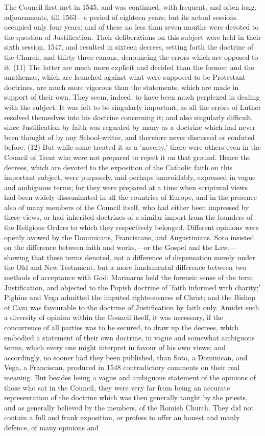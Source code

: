 \documentclass[
]{book}
\begin{document}
The Council first met in 1545, and was continued, with frequent, and often long, adjournments, till 1563---a period of eighteen years; but its actual sessions occupied only four years; and of these no less than seven months were devoted to the question of Justification. Their deliberations on this subject were held in their sixth session, 1547, and resulted in sixteen decrees, setting forth the doctrine of the Church, and thirty-three canons, denouncing the errors which are opposed to it. (11) The latter are much more explicit and decided than the former; and the anathemas, which are launched against what were supposed to be Protestant doctrines, are much more vigorous than the statements, which are made in support of their own. They seem, indeed, to have been much perplexed in dealing with the subject. It was felt to be singularly important, as all the errors of Luther resolved themselves into his doctrine concerning it; and also singularly difficult, since Justification by faith was regarded by many as a doctrine which had never been thought of by any School-writer, and therefore never discussed or confuted before. (12) But while some treated it as a 'novelty,' there were others even in the Council of Trent who were not prepared to reject it on that ground. Hence the decrees, which are devoted to the exposition of the Catholic faith on this important subject, were purposely, and perhaps unavoidably, expressed in vague and ambiguous terms; for they were prepared at a time when scriptural views had been widely disseminated in all the countries of Europe, and in the presence also of many members of the Council itself, who had either been impressed by these views, or had inherited doctrines of a similar import from the founders of the Religious Orders to which they respectively belonged. Different opinions were openly avowed by the Dominicans, Franciscans, and Augustinians. Soto insisted on the difference between faith and works,---or the Gospel and the Law,---showing that these terms denoted, not a difference of dispensation merely under the Old and New Testament, but a more fundamental difference between two methods of acceptance with God; Marinarus held the forensic sense of the term Justification, and objected to the Popish doctrine of 'faith informed with charity;' Pighius and Vega admitted the imputed righteousness of Christ; and the Bishop of Cava was favourable to the doctrine of Justification by faith only. Amidst such a diversity of opinion within the Council itself, it was necessary, if the concurrence of all parties was to be secured, to draw up the decrees, which embodied a statement of their own doctrine, in vague and somewhat ambiguous terms, which every one might interpret in favour of his own views; and accordingly, no sooner had they been published, than Soto, a Dominican, and Vega, a Franciscan, produced in 1548 contradictory comments on their real meaning. But besides being a vague and ambiguous statement of the opinions of those who sat in the Council, they were very far from being an accurate representation of the doctrine which was then generally taught by the priests, and as generally believed by the members, of the Romish Church. They did not contain a full and frank exposition, or profess to offer an honest and manly defence, of many opinions and 
\end{document}
